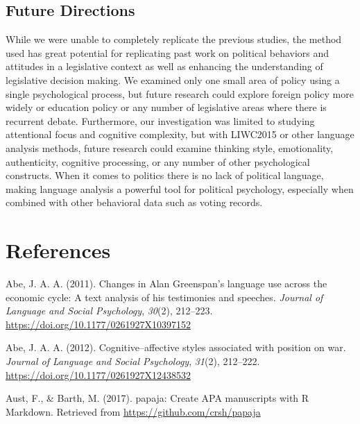 \documentclass[english,,man]{apa6}
\begin{document}
\hypertarget{future-directions}{%
\subsection{Future Directions}\label{future-directions}}

While we were unable to completely replicate the previous studies, the method used has great potential for replicating past work on political behaviors and attitudes in a legislative context as well as enhancing the understanding of legislative decision making. We examined only one small area of policy using a single psychological process, but future research could explore foreign policy more widely or education policy or any number of legislative areas where there is recurrent debate. Furthermore, our investigation was limited to studying attentional focus and cognitive complexity, but with LIWC2015 or other language analysis methods, future research could examine thinking style, emotionality, authenticity, cognitive processing, or any number of other psychological constructs. When it comes to politics there is no lack of political language, making language analysis a powerful tool for political psychology, especially when combined with other behavioral data such as voting records.

\newpage

\hypertarget{references}{%
\section{References}\label{references}}

\setlength{\parindent}{-0.5in}
\setlength{\leftskip}{0.5in}

\hypertarget{refs}{}
\leavevmode\hypertarget{ref-Abe2011}{}%
Abe, J. A. A. (2011). Changes in Alan Greenspan's language use across the economic cycle: A text analysis of his testimonies and speeches. \emph{Journal of Language and Social Psychology}, \emph{30}(2), 212--223. \url{https://doi.org/10.1177/0261927X10397152}

\leavevmode\hypertarget{ref-Abe2012}{}%
Abe, J. A. A. (2012). Cognitive--affective styles associated with position on war. \emph{Journal of Language and Social Psychology}, \emph{31}(2), 212--222. \url{https://doi.org/10.1177/0261927X12438532}

\leavevmode\hypertarget{ref-Aust2017}{}%
Aust, F., \& Barth, M. (2017). papaja: Create APA manuscripts with R Markdown. Retrieved from \url{https://github.com/crsh/papaja}
\end{document}
